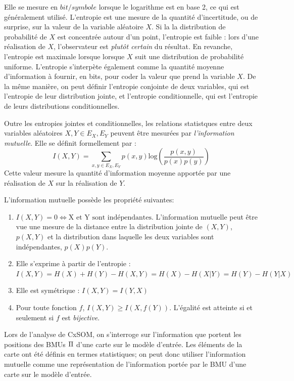 Elle se mesure en $bit/symbole$ lorsque le logarithme est en base 2, ce qui est généralement utilisé. 
L'entropie est une mesure de la quantité d'incertitude, ou de surprise, sur la valeur de la variable aléatoire $X$. Si la la distribution de probabilité de $X$ est concentrée autour d'un point, l'entropie est faible : lors d'une réalisation de $X$, l'observateur est \emph{plutôt certain} du résultat. En revanche, l'entropie est maximale lorsque lorsque $X$ suit une distribution de probabilité uniforme.
L'entropie s'interpète également comme la quantité moyenne d'information à fournir, en bits, pour coder la valeur que prend la variable $X$.
De la même manière, on peut définir l'entropie conjointe de deux variables, qui est l'entropie de leur distribution jointe, et l'entropie conditionnelle, qui est l'entropie de leurs distributions conditionnelles.

Outre les entropies jointes et conditionnelles, les relations statistques entre deux variables aléatoires $X,Y \in E_X,E_Y$ peuvent être mesurées par \emph{l'information mutuelle}. Elle se définit formellement par : 
\begin{equation}
 I(X,Y) = \sum_{x,y \in E_X,E_Y}{p(x,y)\textrm{log}(\frac{p(x,y)}{p(x)p(y)})}
\end{equation}
Cette valeur mesure la quantité d'information moyenne apportée par une réalisation de $X$ sur la réalisation de $Y$.

L'information mutuelle possède les propriété suivantes:
\begin{enumerate}
\item $I(X,Y) = 0 \Leftrightarrow \textrm{X et Y sont indépendantes}$. L'information mutuelle peut être vue une mesure de la distance entre la distribution jointe de $(X,Y)$, $p(X,Y)$ et la distribution dans laquelle les deux variables sont indépendantes, $p(X)p(Y)$.
\item Elle s'exprime à partir de l'entropie : $I(X,Y) = H(X) + H(Y) - H(X,Y) = H(X) - H(X|Y) = H(Y) - H(Y|X)$
\item Elle est symétrique : $I(X,Y) = I(Y,X)$
\item Pour toute fonction $f$, $I(X,Y) \geq I(X,f(Y))$. L'égalité est atteinte si et seulement si $f$ est \emph{bijective}.
\end{enumerate}

Lors de l'analyse de CxSOM, on s'interroge sur l'information que portent les positions des BMUs $\Pi$ d'une carte sur le modèle d'entrée. Les éléments de la carte ont été définis en termes statistiques; on peut donc utiliser l'information mutuelle comme une représentation de l'information portée par le BMU d'une carte sur le modèle d'entrée.

